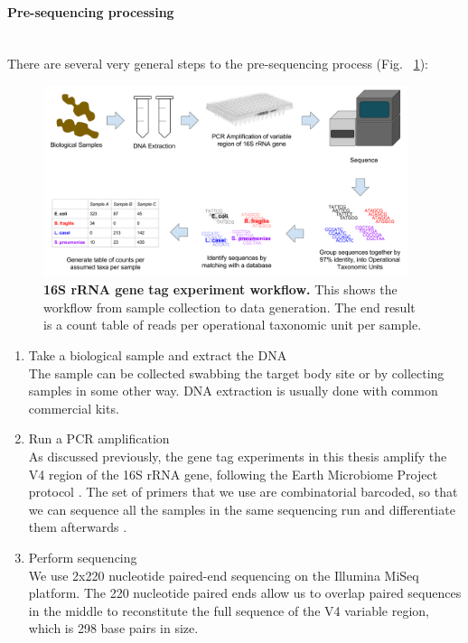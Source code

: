 \paragraph{Pre-sequencing processing}\mbox{}\\
There are several very general steps to the pre-sequencing process (Fig. ~\ref{16s_workflow}):

\begin{figure}[h]
\begin{center}
\includegraphics[width=0.95\textwidth]{16S_rRNA_pipeline.png}
\caption[16S rRNA gene tag experiment workflow.]{\textbf{16S rRNA gene tag experiment workflow.} This shows the workflow from sample collection to data generation. The end result is a count table of reads per operational taxonomic unit per sample.}
\label{16s_workflow}
\end{center}
\end{figure}

\begin{enumerate}
\item Take a biological sample and extract the DNA\\
The sample can be collected swabbing the target body site or by collecting samples in some other way. DNA extraction is usually done with common commercial kits.

\item Run a PCR amplification\\
As discussed previously, the gene tag experiments in this thesis amplify the V4 region of the 16S rRNA gene, following the Earth Microbiome Project protocol \cite{caporaso2012ultra}. The set of primers that we use are combinatorial barcoded, so that we can sequence all the samples in the same sequencing run and differentiate them afterwards \cite{gloor2010microbiome}.

\item Perform sequencing\\
We use 2x220 nucleotide paired-end sequencing on the Illumina MiSeq platform. The 220 nucleotide paired ends allow us to overlap paired sequences in the middle to reconstitute the full sequence of the V4 variable region, which is 298 base pairs in size.
\end{enumerate}

